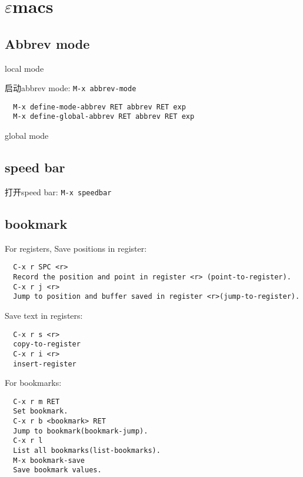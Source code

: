 \chapter{$\varepsilon$macs}

\section{Abbrev mode}

local mode

启动abbrev mode: \verb|M-x abbrev-mode|

\begin{verbatim}
  M-x define-mode-abbrev RET abbrev RET exp
  M-x define-global-abbrev RET abbrev RET exp
\end{verbatim} 
global mode

\section{speed bar}

打开speed bar: \verb|M-x speedbar|

\section{bookmark}

For registers,
Save positions in register:
\begin{verbatim}
  C-x r SPC <r>
  Record the position and point in register <r> (point-to-register).
  C-x r j <r>
  Jump to position and buffer saved in register <r>(jump-to-register).
\end{verbatim}

Save text in registers:
\begin{verbatim}
  C-x r s <r>
  copy-to-register
  C-x r i <r>
  insert-register
\end{verbatim}

For bookmarks:

\begin{verbatim}
  C-x r m RET
  Set bookmark.
  C-x r b <bookmark> RET
  Jump to bookmark(bookmark-jump).
  C-x r l
  List all bookmarks(list-bookmarks).
  M-x bookmark-save
  Save bookmark values.
\end{verbatim} 
